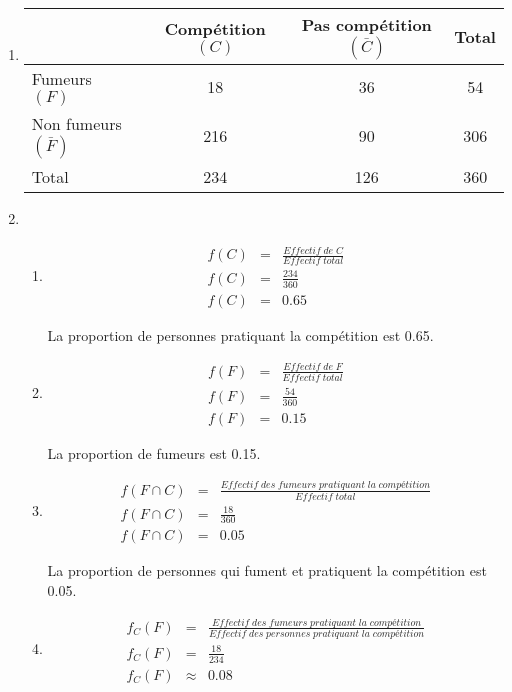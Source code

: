 \documentclass[12pt,a4paper]{article}
\begin{document}
\begin{enumerate}[label=\arabic*)]
	\item \begin{tabular}{|@{\ }l@{\ }|@{\ }c@{\ }|@{\ }c@{\ }|@{$\quad$}c@{$\quad$}|}
		\hline
		& Compétition $(C)$ & Pas compétition $(\bar{C})$ & Total \\ \hline
		Fumeurs  $(F)$   & 18 & 36 & 54 \\ \hline
		Non fumeurs $(\bar{F})$ & 216 & 90 & 306 \\ \hline
		Total & 234 & 126 & 360 \\ \hline
	\end{tabular}
	
	\item \begin{enumerate}[label=\alph*)]
		\item \begin{eqnarray*}
			f(C) &=& \frac{Effectif\; de\; C}{Effectif\; total} \\
			f(C) &=& \frac{234}{360} \\
			f(C) &=& \num{0.65}
		\end{eqnarray*}
		
		La proportion de personnes pratiquant la compétition est \num{0.65}.
		
		\item \begin{eqnarray*}
			f(F) &=& \frac{Effectif\; de\; F}{Effectif\; total} \\
			f(F) &=& \frac{54}{360} \\
			f(F) &=& \num{0.15}
		\end{eqnarray*}
		
		La proportion de fumeurs est \num{0.15}.
		
		\item \begin{eqnarray*}
			f(F \cap C) &=& \frac{Effectif\; des\; fumeurs \; pratiquant\; la\; compétition}{Effectif\; total} \\
			f(F \cap C) &=& \frac{18}{360} \\
			f(F \cap C) &=& \num{0.05}
		\end{eqnarray*}
		
		La proportion de personnes qui fument et pratiquent la compétition est \num{0.05}.
		
		\item \begin{eqnarray*}
			f_C(F) &=& \frac{Effectif\; des\; fumeurs \; pratiquant\; la\; compétition}{Effectif\; des\; personnes\; pratiquant\; la\; compétition} \\
			f_C(F) &=& \frac{18}{234} \\
			f_C(F) &\approx& \num{0.08}
		\end{eqnarray*}
		

\end{enumerate}
\end{enumerate}
\end{document}
